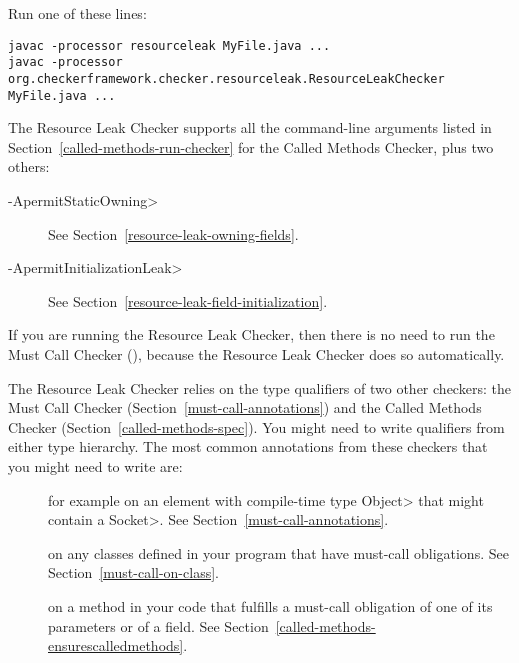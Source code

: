 
Run one of these lines:

\begin{Verbatim}
javac -processor resourceleak MyFile.java ...
javac -processor org.checkerframework.checker.resourceleak.ResourceLeakChecker MyFile.java ...
\end{Verbatim}

The Resource Leak Checker supports all the command-line arguments
listed in Section~\ref{called-methods-run-checker} for
the Called Methods Checker, plus two others:

\begin{description}
\item[\<-ApermitStaticOwning>]
  See Section~\ref{resource-leak-owning-fields}.
\item[\<-ApermitInitializationLeak>]
  See Section~\ref{resource-leak-field-initialization}.
\end{description}

If you are running the Resource Leak Checker, then there is no need to run
the Must Call Checker (), because the
Resource Leak Checker does so automatically.



The Resource Leak Checker relies on the type qualifiers of two other checkers:
the Must Call Checker (Section~\ref{must-call-annotations}) and
the Called Methods Checker (Section~\ref{called-methods-spec}). You might need
to write qualifiers from either type hierarchy. The most common annotations from
these checkers that you might need to write are:

\begin{description}

\item[]
for example on an element with compile-time type \<Object> that might contain a \<Socket>.
See Section~\ref{must-call-annotations}.

\item[]
on any classes defined in your program that have must-call obligations. See Section~\ref{must-call-on-class}.

\item[] on a method in
your code that fulfills a must-call obligation of one of its parameters or of a field.
See Section~\ref{called-methods-ensurescalledmethods}.

\end{description}

